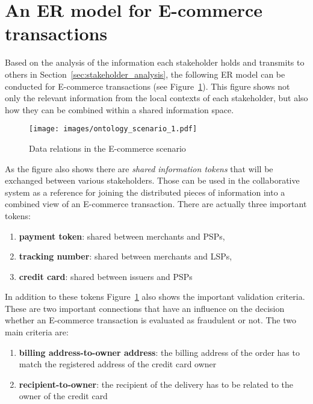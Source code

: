 
\section{An \gls{ER} model for \gls{E-commerce} transactions}
\label{sec:data_model_transactions}

Based on the analysis of the information each stakeholder holds and transmits to others in Section~\ref{sec:stakeholder_analysis}, the following \gls{ER} model can be conducted for \gls{E-commerce} transactions (see Figure~\ref{fig:images_data_model}). This figure shows not only the relevant information from the local contexts of each stakeholder, but also how they can be combined within a shared information space. \\

\begin{figure}[!ht]
  \centering
  \texttt{[image: images/ontology\_scenario\_1.pdf]}
  \caption[Data relations in the E-commerce scenario]{Data relations in the \gls{E-commerce} scenario}
\label{fig:images_data_model}
\end{figure}

As the figure also shows there are \emph{shared information tokens} that will be exchanged between various stakeholders. Those can be used in the collaborative system as a reference for joining the distributed pieces of information into a combined view of an \gls{E-commerce} transaction. There are actually three important tokens: \@

\begin{enumerate}
  \item \textbf{payment token}: shared between merchants and \gls{PSP}s,
  \item \textbf{tracking number}: shared between merchants and \gls{LSP}s,
  \item \textbf{credit card}: shared between issuers and \gls{PSP}s
\end{enumerate}

In addition to these tokens Figure~\ref{fig:images_data_model} also shows the important validation criteria. These are two important connections that have an influence on the decision whether an \gls{E-commerce} transaction is evaluated as fraudulent or not. The two main criteria are: \@

\begin{enumerate}
  \item \textbf{billing address-to-owner address}: the billing address of the order has to match the registered address of the credit card owner
  \item \textbf{recipient-to-owner}: the recipient of the delivery has to be related to the owner of the credit card
\end{enumerate}

